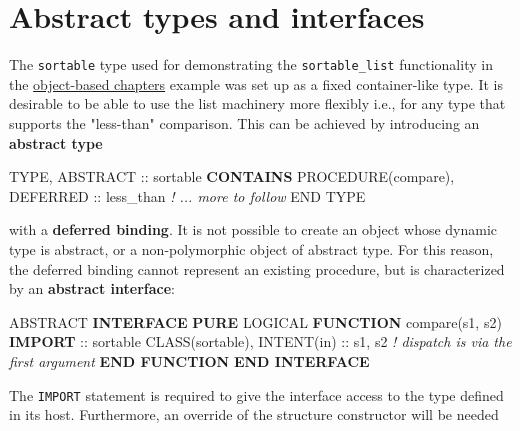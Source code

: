 \documentclass[]{scrartcl}
\newenvironment{Shaded}{}{}
\newcommand{\CommentTok}[1]{\textcolor[rgb]{0.38,0.63,0.69}{\textit{#1}}}
\newcommand{\DataTypeTok}[1]{\textcolor[rgb]{0.56,0.13,0.00}{#1}}
\newcommand{\KeywordTok}[1]{\textcolor[rgb]{0.00,0.44,0.13}{\textbf{#1}}}
\newcommand{\NormalTok}[1]{#1}
\begin{document}
\section{Abstract types and
interfaces}\label{abstract-types-and-interfaces}

The \texttt{sortable} type used for demonstrating the
\texttt{sortable\_list} functionality in the
\href{https://en.wikipedia.org/wiki/User:RBaSc/draft_ftnoo\#Object-based_features_and_programming_techniques}{object-based
chapter\textquotesingle s} example was set up as a fixed container-like
type. It is desirable to be able to use the list machinery more flexibly
i.e., for any type that supports the "less-than" comparison. This can be
achieved by introducing an \textbf{abstract type}

\begin{Shaded}
\begin{Highlighting}[]
\DataTypeTok{TYPE}\NormalTok{, }\DataTypeTok{ABSTRACT} \DataTypeTok{::}\NormalTok{ sortable}
\KeywordTok{CONTAINS}
   \DataTypeTok{PROCEDURE(compare)}\NormalTok{, }\DataTypeTok{DEFERRED} \DataTypeTok{::}\NormalTok{ less\_than}
   \CommentTok{! ... more to follow}
\DataTypeTok{END TYPE}
\end{Highlighting}
\end{Shaded}

with a \textbf{deferred binding}. It is not possible to create an object
whose dynamic type is abstract, or a non-polymorphic object of abstract
type. For this reason, the deferred binding cannot represent an existing
procedure, but is characterized by an \textbf{abstract interface}:

\begin{Shaded}
\begin{Highlighting}[]
\DataTypeTok{ABSTRACT} \KeywordTok{INTERFACE}
   \KeywordTok{PURE} \DataTypeTok{LOGICAL} \KeywordTok{FUNCTION}\NormalTok{ compare(s1, s2)}
      \KeywordTok{IMPORT} \DataTypeTok{::}\NormalTok{ sortable}
      \DataTypeTok{CLASS(sortable)}\NormalTok{, }\DataTypeTok{INTENT(in)} \DataTypeTok{::}\NormalTok{ s1, s2}
      \CommentTok{! dispatch is via the first argument}
   \KeywordTok{END FUNCTION}
\KeywordTok{END INTERFACE}
\end{Highlighting}
\end{Shaded}

The \texttt{IMPORT} statement is required to give the interface access
to the type defined in its host. Furthermore, an override of the
structure constructor will be needed
\end{document}
